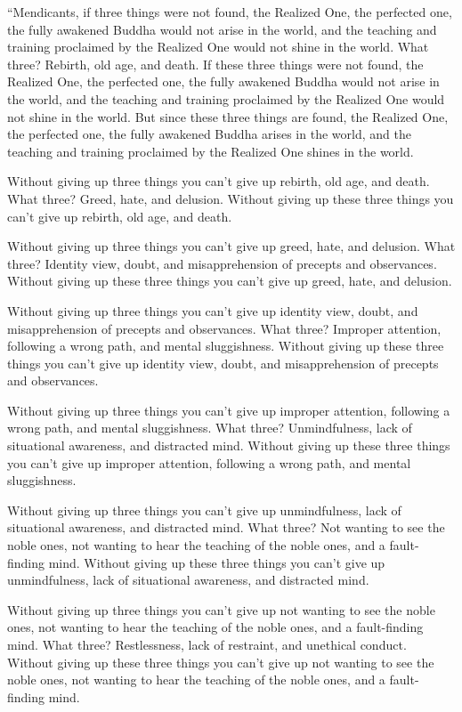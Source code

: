 \documentclass[12pt,openany]{book}%
\begin{document}
“Mendicants, if three things were not found, the Realized One, the perfected one, the fully awakened Buddha would not arise in the world, and the teaching and training proclaimed by the Realized One would not shine in the world. What three? Rebirth, old age, and death. If these three things were not found, the Realized One, the perfected one, the fully awakened Buddha would not arise in the world, and the teaching and training proclaimed by the Realized One would not shine in the world. But since these three things are found, the Realized One, the perfected one, the fully awakened Buddha arises in the world, and the teaching and training proclaimed by the Realized One shines in the world. 

Without giving up three things you can’t give up rebirth, old age, and death. What three? Greed, hate, and delusion. Without giving up these three things you can’t give up rebirth, old age, and death. 

Without giving up three things you can’t give up greed, hate, and delusion. What three? Identity view, doubt, and misapprehension of precepts and observances. Without giving up these three things you can’t give up greed, hate, and delusion. 

Without giving up three things you can’t give up identity view, doubt, and misapprehension of precepts and observances. What three? Improper attention, following a wrong path, and mental sluggishness. Without giving up these three things you can’t give up identity view, doubt, and misapprehension of precepts and observances. 

Without giving up three things you can’t give up improper attention, following a wrong path, and mental sluggishness. What three? Unmindfulness, lack of situational awareness, and distracted mind. Without giving up these three things you can’t give up improper attention, following a wrong path, and mental sluggishness. 

Without giving up three things you can’t give up unmindfulness, lack of situational awareness, and distracted mind. What three? Not wanting to see the noble ones, not wanting to hear the teaching of the noble ones, and a fault-finding mind. Without giving up these three things you can’t give up unmindfulness, lack of situational awareness, and distracted mind. 

Without giving up three things you can’t give up not wanting to see the noble ones, not wanting to hear the teaching of the noble ones, and a fault-finding mind. What three? Restlessness, lack of restraint, and unethical conduct. Without giving up these three things you can’t give up not wanting to see the noble ones, not wanting to hear the teaching of the noble ones, and a fault-finding mind. 
\end{document}
